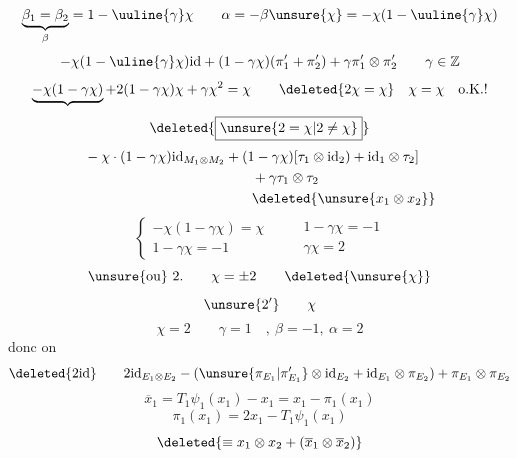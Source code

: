 \[
\underbrace{\beta_1=\beta_2}_{\beta}=1-\uuline{\gamma}\chi
\qquad
\alpha=-\beta\unsure{\chi}=-\chi(1-\uuline{\gamma}\chi)
\]
\[
-\chi(1-\uline{\gamma}\chi)\mathrm{id}
+(1-\gamma\chi)(\pi'_1+\pi'_2)+\gamma\pi'_1\otimes\pi'_2
\qquad\gamma\in\mathbb Z
\]
\[
\underbrace{-\chi(1-\gamma\chi)}+2(1-\gamma\chi)\chi+\gamma\chi^2=\chi
\qquad\deleted{2\chi=\chi}\quad\chi=\chi\quad\text{o.K.!}
\]
\[
\deleted{\boxed{\unsure{2=\chi|2\ne\chi}}}
\]
\[
\begin{aligned}
&-\chi\cdot(1-\gamma\chi)\mathrm{id}_{M_1\otimes M_2}
+(1-\gamma\chi)[\tau_1\otimes\mathrm{id}_2)+\mathrm{id}_1\otimes\tau_2]\\
&\hspace{12em}+\gamma\tau_1\otimes\tau_2\\
&\hspace{12em}\deleted{\unsure{x_1\otimes x_2}}
\end{aligned}
\]
\[
\left\{\begin{array}{l}
-\chi(1-\gamma\chi)=\chi\\1-\gamma\chi=-1
\end{array}\right.
\qquad
\begin{array}{c}1-\gamma\chi=-1\\\boxed{\gamma\chi=2}\end{array}
\]
\[
\text{\unsure{ou} }2.\qquad\chi=\pm2
\qquad\deleted{\unsure{\chi}}
\]
\[
\unsure{2'}\qquad\chi
\]
\[
\chi=2\qquad\gamma=1\quad,\ \beta=-1,\ \alpha=2
\]
donc on 
\[
\deleted{2\mathrm{id}}\qquad
2\mathrm{id}_{E_1\otimes E_2}
-(\unsure{\pi_{E_1}|\pi'_{E_1}}\otimes\mathrm{id}_{E_2}
+\mathrm{id}_{E_1}\otimes\pi_{E_2})+\pi_{E_1}\otimes\pi_{E_2}
\]
\[
\overline{x}_1=T_1\psi_1(x_1)-x_1=x_1-\pi_1(x_1)
\]
\[
\pi_1(x_1)=2x_1-T_1\psi_1(x_1)
\]
\[
\deleted{\equiv x_1\otimes x_2+(\overline{x}_1\otimes\overline{x}_2)}
\]
